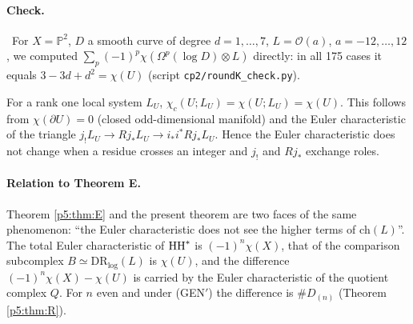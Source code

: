 \paragraph{Check.} \tV\ For $X=\mathbb P^2$, $D$ a smooth curve of degree $d=1,\dots,7$, $L=\mathcal O(a)$, $a=-12,\dots,12$, we computed $\sum_p(-1)^p\chi(\Omega^p(\log D)\otimes L)$ directly: in all 175 cases it equals $3-3d+d^2=\chi(U)$ (script \texttt{cp2/roundK\_check.py}).

\begin{cor}\label{p5:cor:wall}
For a rank one local system $L_U$, $\chi_c(U;L_U)=\chi(U;L_U)=\chi(U)$. This follows from $\chi(\partial U)=0$ (closed odd-dimensional manifold) and the Euler characteristic of the triangle $j_!L_U\to Rj_*L_U\to i_*i^*Rj_*L_U$. Hence the Euler characteristic does not change when a residue crosses an integer and $j_!$ and $Rj_*$ exchange roles.
\end{cor}
\paragraph{Relation to Theorem E.} Theorem \ref{p5:thm:E} and the present theorem are two faces of the same phenomenon: ``the Euler characteristic does not see the higher terms of $\mathrm{ch}(L)$''. The total Euler characteristic of $\mathrm{HH}^*$ is $(-1)^n\chi(X)$, that of the comparison subcomplex $B\simeq\mathrm{DR}_{\log}(L)$ is $\chi(U)$, and the difference $(-1)^n\chi(X)-\chi(U)$ is carried by the Euler characteristic of the quotient complex $Q$. For $n$ even and under (GEN$'$) the difference is $\#D_{(n)}$ (Theorem \ref{p5:thm:R}).

